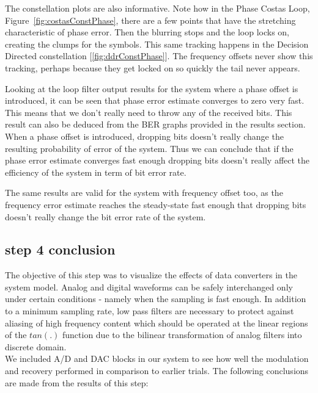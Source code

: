 \documentclass[]{article}
\begin{document}
The constellation plots are also informative.  Note how in the Phase Costas Loop, Figure~\ref{fig:costasConstPhase}, there are a few points that have the stretching characteristic of phase error.  Then the blurring stops and the loop locks on, creating the clumps for the symbols.  This same tracking happens in the Decision Directed constellation [\ref{fig:ddrConstPhase}].  The frequency offsets never show this tracking, perhaps because they get locked on so quickly the tail never appears.

Looking at the loop filter output results for the system where a phase offset is introduced, it can be seen that phase error estimate converges to zero very fast. This means that we don't really need to throw any of the received bits. This result can also be deduced from the BER graphs provided in the results section. When a phase offset is introduced, dropping bits doesn't really change the resulting probability of error of the system. Thus we can conclude that if the phase error estimate converges fast enough dropping bits doesn't really affect the efficiency of the system in term of bit error rate. 

The same results are valid for the system with frequency offset too, as the frequency error estimate reaches the steady-state fast enough that dropping bits doesn't really change the bit error rate of the system. 

\subsection{step 4 conclusion}
The objective of this step was to visualize the effects of data converters in the system model.  Analog and digital waveforms can be safely interchanged only under certain conditions - namely when the sampling is fast enough.  In addition to a minimum sampling rate, low pass filters are necessary to protect against aliasing of high frequency content which should be operated at the linear regions of the $tan(.) $ function due to the bilinear transformation of analog filters into discrete domain.  \\

We included A/D and DAC blocks in our system to see how well the modulation and recovery performed in comparison to earlier trials. The following conclusions are made from the results of this step:
\end{document}
